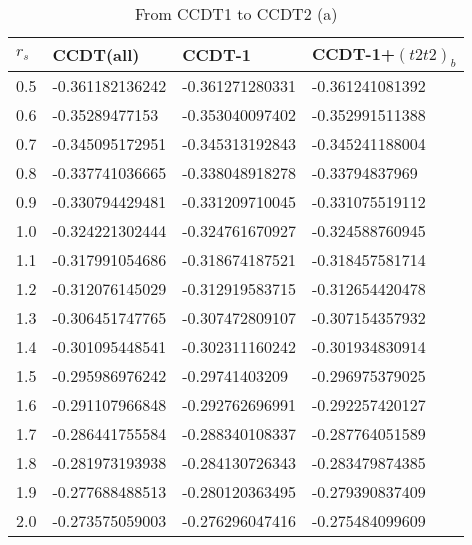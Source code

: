 \begin{table}[hbtp]
\caption{From CCDT1 to CCDT2 (a)}
\begin{center}
\begin{threeparttable}
\begin{tabular}{l l l l}
    \toprule
$r_s$ & CCDT(all) & CCDT-1 & CCDT-1+$(t2t2)_b$  \\ \hline
0.5 & -0.361182136242 & -0.361271280331 & -0.361241081392   \\
0.6 & -0.35289477153 & -0.353040097402 & -0.352991511388   \\
0.7 & -0.345095172951 & -0.345313192843 & -0.345241188004   \\
0.8 & -0.337741036665 & -0.338048918278 & -0.33794837969   \\
0.9 & -0.330794429481 & -0.331209710045 & -0.331075519112   \\
1.0 & -0.324221302444 & -0.324761670927 & -0.324588760945   \\
1.1 & -0.317991054686 & -0.318674187521 & -0.318457581714   \\
1.2 & -0.312076145029 & -0.312919583715 & -0.312654420478   \\
1.3 & -0.306451747765 & -0.307472809107 & -0.307154357932   \\
1.4 & -0.301095448541 & -0.302311160242 & -0.301934830914   \\
1.5 & -0.295986976242 & -0.29741403209 & -0.296975379025   \\
1.6 & -0.291107966848 & -0.292762696991 & -0.292257420127   \\
1.7 & -0.286441755584 & -0.288340108337 & -0.287764051589   \\
1.8 & -0.281973193938 & -0.284130726343 & -0.283479874385   \\
1.9 & -0.277688488513 & -0.280120363495 & -0.279390837409   \\
2.0 & -0.273575059003 & -0.276296047416 & -0.275484099609   \\
\bottomrule
\end{tabular}
\begin{tablenotes}
\end{tablenotes}
\end{threeparttable}
\end{center}
\label{tab:ccdt1_to_ccdt2_1}
\end{table}


